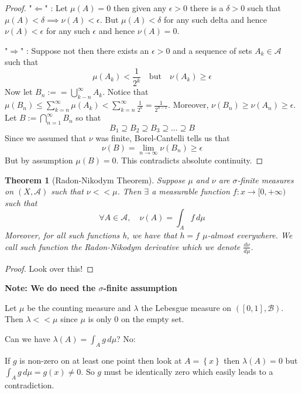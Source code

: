 \documentclass[11pt]{article}
\newcommand{\defeq}{:=}
\newcommand{\dm}{\ensuremath{\,d\mu}}
\newcommand{\mdf}[1]{{\color{red} #1}}
\newenvironment{note}
	{\begin{mdframed}[backgroundcolor=white, linecolor=red, roundcorner=5pt, linewidth=1pt]\bfseries{Note:}\normalfont}
	{\end{mdframed}}
\newtheorem{theorem}{Theorem}[section]
\begin{document}
\begin{proof}
"$\Longleftarrow$" : Let $\mu(A) = 0$ then given any $\epsilon > 0 $ there is a $\delta>0$ such that $\mu(A) < \delta \implies \nu(A) < \epsilon$.
But $\mu(A) < \delta$ for any such delta and hence $\nu(A)<\epsilon$ for any such $\epsilon$ and hence $\nu(A)=0$.

"$\Longrightarrow$" : Suppose not then there exists an $\epsilon >0$ and a sequence of sets $A_k\in\mathcal{A}$ such that
\[
	\mu(A_k) < \frac{1}{2^k} \quad \text{but} \quad \nu(A_k) \geq \epsilon
\]
Now let $B_n\defeq=\bigcup_{k-n}^\infty A_k$.
Notice that $\mu(B_n) \leq\sum_{k=n}^{\infty}\mu(A_k) < \sum_{k=n}^{\infty}\frac{1}{2^k} = \frac{1}{2^{n-1}}$.
Moreover, $\nu(B_n) \geq \nu(A_n) \geq \epsilon$.
Let $B\defeq \bigcap_{n=1}^\infty B_n$ so that
\[
B_1 \supseteq B_2 \supseteq B_3 \supseteq \dots \supseteq B
\]
Since we assumed that $\nu$ was finite, Borel-Cantelli tells us that
\[
	\nu(B)=\lim_{n\to\infty}\nu(B_n)\geq \epsilon
\]
But by assumption $\mu(B) = 0$.
This contradicts absolute continuity.
\end{proof}

\begin{theorem}[Radon-Nikodym Theorem]
Suppose $\mu$ and $\nu$ are $\sigma$-finite measures on $(X, \mathcal{A})$ such that $\nu << \mu$.
Then $\exists$ a measurable function $f: x \to [0, +\infty)$ such that
\[
	\forall A \in \mathcal{A}, \quad \nu(A)=\int_A f \dm
\]
Moreover, for all such functions h, we have that $h=f$ $\mu$-almost everywhere.
We call such function the \mdf{Radon-Nikodym derivative} which we denote $\frac{d\nu}{d\mu}$.
\end{theorem}
\begin{proof}
Look over this!
\end{proof}
\begin{note}
	\textbf{We do need the $\sigma$-finite assumption}

	Let $\mu$ be the counting measure and $\lambda$ the Lebesgue measure on $([0,1], \mathcal{B})$.
	Then $\lambda << \mu$ since $\mu$ is only 0 on the empty set.

	Can we have $\lambda(A) = \int_A g \dm$?
	No:

	If $g$ is non-zero on at least one point then look at $A=\left\{x\right\}$ then $\lambda(A)=0$ but $\int_A g \dm = g(x)\neq 0$.
	So $g$ must be identically zero which easily leads to a contradiction.
\end{note}
\end{document}
